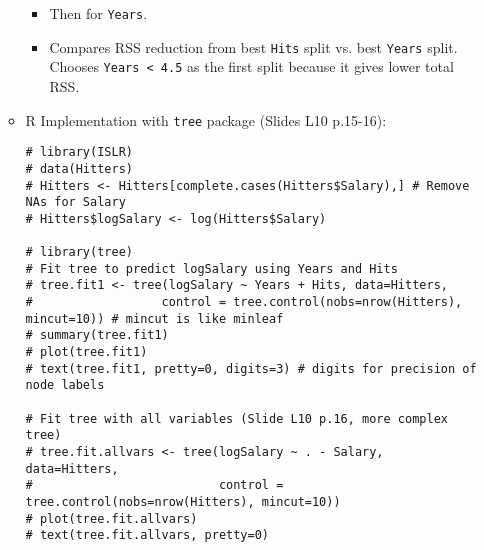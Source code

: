 \documentclass[12pt,a4paper]{article}
\newcommand{\Rpackage}[1]{\texttt{#1}} %
\newcommand{\Rcode}[1]{\texttt{#1}} %
\begin{document}
\begin{itemize}
\begin{itemize}
\begin{itemize}
                    \item Then for \Rcode{Years}.
                    \item Compares RSS reduction from best \Rcode{Hits} split vs. best \Rcode{Years} split. Chooses \Rcode{Years < 4.5} as the first split because it gives lower total RSS.
                \end{itemize}
            \item R Implementation with \Rpackage{tree} package (Slides L10 p.15-16):
\begin{lstlisting}[caption={Fitting a Regression Tree with \Rpackage{tree} (Slides L10 p.15)}]
# library(ISLR)
# data(Hitters)
# Hitters <- Hitters[complete.cases(Hitters$Salary),] # Remove NAs for Salary
# Hitters$logSalary <- log(Hitters$Salary)

# library(tree)
# Fit tree to predict logSalary using Years and Hits
# tree.fit1 <- tree(logSalary ~ Years + Hits, data=Hitters,
#                  control = tree.control(nobs=nrow(Hitters), mincut=10)) # mincut is like minleaf
# summary(tree.fit1)
# plot(tree.fit1)
# text(tree.fit1, pretty=0, digits=3) # digits for precision of node labels

# Fit tree with all variables (Slide L10 p.16, more complex tree)
# tree.fit.allvars <- tree(logSalary ~ . - Salary, data=Hitters,
#                          control = tree.control(nobs=nrow(Hitters), mincut=10))
# plot(tree.fit.allvars)
# text(tree.fit.allvars, pretty=0)
\end{lstlisting}
        \end{itemize}


\end{itemize}
\end{document}
